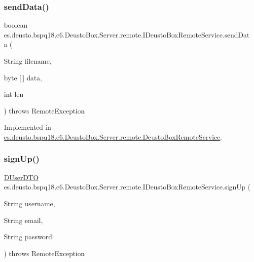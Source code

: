 \subsubsection{\texorpdfstring{send\+Data()}{sendData()}}
{\footnotesize\ttfamily boolean es.\+deusto.\+bspq18.\+e6.\+Deusto\+Box.\+Server.\+remote.\+I\+Deusto\+Box\+Remote\+Service.\+send\+Data (\begin{DoxyParamCaption}\item[{String}]{filename,  }\item[{byte \mbox{[}$\,$\mbox{]}}]{data,  }\item[{int}]{len }\end{DoxyParamCaption}) throws Remote\+Exception}



Implemented in \mbox{\hyperlink{classes_1_1deusto_1_1bspq18_1_1e6_1_1_deusto_box_1_1_server_1_1remote_1_1_deusto_box_remote_service_aeeafed7d44048979f7d349f38300fc82}{es.\+deusto.\+bspq18.\+e6.\+Deusto\+Box.\+Server.\+remote.\+Deusto\+Box\+Remote\+Service}}.

\mbox{\label{interfacees_1_1deusto_1_1bspq18_1_1e6_1_1_deusto_box_1_1_server_1_1remote_1_1_i_deusto_box_remote_service_ab3adf6a3ab12372cf306b30b3fd98636}} 
\subsubsection{\texorpdfstring{sign\+Up()}{signUp()}}
{\footnotesize\ttfamily \mbox{\hyperlink{classes_1_1deusto_1_1bspq18_1_1e6_1_1_deusto_box_1_1_server_1_1dto_1_1_d_user_d_t_o}{D\+User\+D\+TO}} es.\+deusto.\+bspq18.\+e6.\+Deusto\+Box.\+Server.\+remote.\+I\+Deusto\+Box\+Remote\+Service.\+sign\+Up (\begin{DoxyParamCaption}\item[{String}]{username,  }\item[{String}]{email,  }\item[{String}]{password }\end{DoxyParamCaption}) throws Remote\+Exception}



